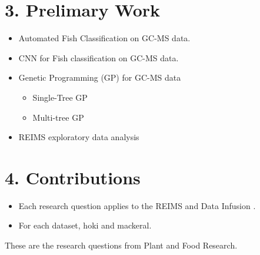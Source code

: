 \documentclass[11pt, a4paper, twoside, openright]{report}
\begin{document}
\section*{3. Prelimary Work}

\begin{itemize}
  \item Automated Fish Classification on GC-MS data. 
  \item CNN for Fish classification on GC-MS data. 
  \item Genetic Programming (GP) for GC-MS data 
  \begin{itemize}
    \item Single-Tree GP 
    \item Multi-tree GP 
  \end{itemize}
  \item REIMS exploratory data analysis 
\end{itemize}


\section*{4. Contributions}

\begin{itemize}
  \item Each research question applies to the REIMS and Data Infusion . 
  \item For each dataset, hoki and mackeral. 
\end{itemize}

These are the research questions from Plant and Food Research. 
\end{document}
